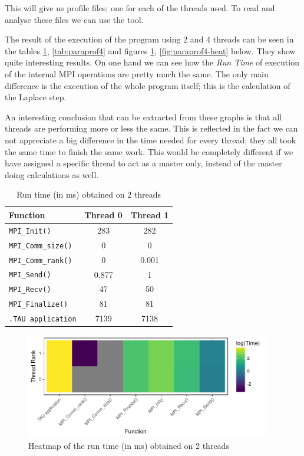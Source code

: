 This will give us  profile files; one for each of the threads used. To read and analyse these files we can use the  tool.

\bigskip

The result of the execution of the program using 2 and 4 threads can be seen in the tables \ref{tab:paraprof2}, \ref{tab:paraprof4} and figures \ref{fig:paraprof2-heat}, \ref{fig:paraprof4-heat} below. They show quite interesting results. On one hand we can see how the \emph{Run Time} of execution of the internal MPI operations are pretty much the same. The only main difference is the execution of the whole program itself; this is the calculation of the Laplace step.

An interesting conclusion that can be extracted from these graphs is that all threads are performing more or less the same. This is reflected in the fact we can not appreciate a big difference in the time needed for every thread; they all took the same time to finish the same work. This would be completely different if we have assigned a specific thread to act as a master only, instead of the master doing calculations as well.

\begin{table}[H]
    \centering
    \begin{tabular}{l c c}
        \toprule
        \toprule
        \textbf{Function} & \textbf{Thread 0}    & \textbf{Thread 1} \\
        \midrule
        \texttt{MPI\_Init()}       & \num{283}   & \num{282}   \\
        \texttt{MPI\_Comm\_size()} & \num{0}     & \num{0}     \\
        \texttt{MPI\_Comm\_rank()} & \num{0}     & \num{0.001} \\
        \texttt{MPI\_Send()}       & \num{0.877} & \num{1}     \\
        \texttt{MPI\_Recv()}       & \num{47}    & \num{50}    \\
        \texttt{MPI\_Finalize()}   & \num{81}    & \num{81}    \\
        \texttt{.TAU application}  & \num{7139}  & \num{7138}  \\
        \bottomrule
    \end{tabular}
    \caption{Run time (in ms) obtained on 2 threads}
    \label{tab:paraprof2}
\end{table}

\begin{figure}[H]
	\centering
	\includegraphics[width=0.95\textwidth]{images/pprof-2}
	\caption{Heatmap of the run time (in ms) obtained on 2 threads}
	\label{fig:paraprof2-heat}
\end{figure}

